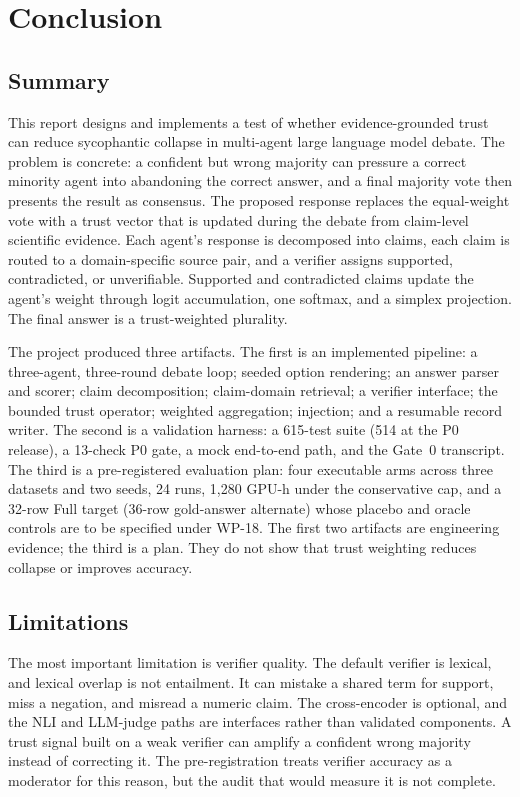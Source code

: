 \chapter{Conclusion}\label{chapter:conclusion}

\section{Summary}\label{sec:conclusion-summary}

This report designs and implements a test of whether evidence-grounded trust can reduce sycophantic collapse in multi-agent large language model debate. The problem is concrete: a confident but wrong majority can pressure a correct minority agent into abandoning the correct answer, and a final majority vote then presents the result as consensus. The proposed response replaces the equal-weight vote with a trust vector that is updated during the debate from claim-level scientific evidence. Each agent's response is decomposed into claims, each claim is routed to a domain-specific source pair, and a verifier assigns supported, contradicted, or unverifiable. Supported and contradicted claims update the agent's weight through logit accumulation, one softmax, and a simplex projection. The final answer is a trust-weighted plurality.

The project produced three artifacts. The first is an implemented pipeline: a three-agent, three-round debate loop; seeded option rendering; an answer parser and scorer; claim decomposition; claim-domain retrieval; a verifier interface; the bounded trust operator; weighted aggregation; injection; and a resumable record writer. The second is a validation harness: a 615-test suite (514 at the P0 release), a 13-check P0 gate, a mock end-to-end path, and the Gate~0 transcript. The third is a pre-registered evaluation plan: four executable arms across three datasets and two seeds, 24 runs, 1,280 GPU-h under the conservative cap, and a 32-row Full target (36-row gold-answer alternate) whose placebo and oracle controls are to be specified under WP-18. The first two artifacts are engineering evidence; the third is a plan. They do not show that trust weighting reduces collapse or improves accuracy.

\section{Limitations}\label{sec:conclusion-limitations}

The most important limitation is verifier quality. The default verifier is lexical, and lexical overlap is not entailment. It can mistake a shared term for support, miss a negation, and misread a numeric claim. The cross-encoder is optional, and the NLI and LLM-judge paths are interfaces rather than validated components. A trust signal built on a weak verifier can amplify a confident wrong majority instead of correcting it. The pre-registration treats verifier accuracy as a moderator for this reason, but the audit that would measure it is not complete.

